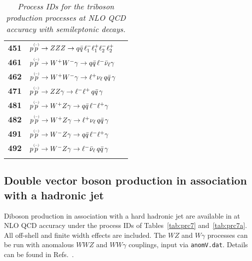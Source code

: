 \documentclass[english,12pt]{article}
\begin{document}
\begin{table}[t!]
\begin{center}
\begin{tabular}{c|l|l}
\bf 451 & $p \overset{\mbox{\tiny{(--)}}}{p} \to ZZZ \to  q \bar{q} \, \ell_{1}^{-} \ell_{1}^{+} \ell_{2}^{-}
\ell_{2}^{+}  $ & \\
\bf 461 & $p \overset{\mbox{\tiny{(--)}}}{p} \to W^{+}W^{-} \gamma \to  q \bar{q} \,
\ell^{-}\bar{\nu}_{\ell} \gamma$ & \\
\bf 462 & $p \overset{\mbox{\tiny{(--)}}}{p} \to W^{+}W^{-} \gamma \to \ell^{+} \nu_{\ell}
\, q \bar{q} \, \gamma$ & \\
\bf 471 & $p \overset{\mbox{\tiny{(--)}}}{p} \to Z Z \gamma \to \ell^{-} \ell^{+} \, q \bar{q} \, \gamma$ & \\
\bf 481 & $p \overset{\mbox{\tiny{(--)}}}{p} \to W^{+} Z \gamma \to  q \bar{q} \, \ell^{-}
\ell^{+} \gamma$ & \\
\bf 482 & $p \overset{\mbox{\tiny{(--)}}}{p} \to W^{+} Z \gamma \to \ell^{+}\nu_{\ell} \, q \bar{q} \, \gamma$ & \\
\bf 491 & $p \overset{\mbox{\tiny{(--)}}}{p} \to W^{-} Z \gamma \to  q \bar{q} \, \ell^{-}
\ell^{+} \gamma$ & \\
\bf 492 & $p \overset{\mbox{\tiny{(--)}}}{p} \to W^{-} Z \gamma \to \ell^{-} \bar{\nu}_{\ell} \, q \bar{q} \, \gamma$ & \\
&\\
\hline
\end{tabular}
\caption {\em  Process IDs for the triboson production processes at NLO QCD accuracy with semileptonic decays.}
\vspace{0.2cm}
\label{tab:prc5a}
\end{center}
\end{table}


\subsection{Double vector boson production in association with a hadronic jet}

%
Diboson production in association with a hard hadronic jet are
available in {} at NLO QCD accuracy under the process IDs of
Tables~\ref{tab:prc7} and~\ref{tab:prc7a}. All off-shell and finite width effects
are included. The $WZ$ and $W\gamma$ processes can be run with anomalous $WWZ$ and $WW\gamma$ couplings, input via {\tt anomV.dat}.
Details can be found in
Refs.~\cite{Campanario:2010hv,Campanario:2010xn,Campanario:2010hp,
Campanario:2009um,Campanario:2012bh,Campanario:2013wta,Campanario:2015nha}.  
\end{document}
